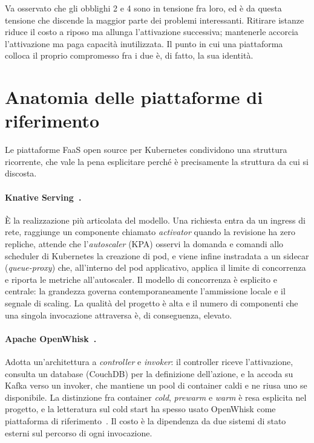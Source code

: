 Va osservato che gli obblighi 2 e 4 sono in tensione fra loro, ed \`e da questa
tensione che discende la maggior parte dei problemi interessanti. Ritirare
istanze riduce il costo a riposo ma allunga l'attivazione successiva; mantenerle
accorcia l'attivazione ma paga capacit\`a inutilizzata. Il punto in cui una
piattaforma colloca il proprio compromesso fra i due \`e, di fatto, la sua
identit\`a.

\section{Anatomia delle piattaforme di riferimento}

Le piattaforme FaaS open source per Kubernetes condividono una struttura
ricorrente, che vale la pena esplicitare perch\'e \`e precisamente la struttura
da cui \nf{} si discosta.

\paragraph{Knative Serving~\cite{knative}.} \`E la realizzazione pi\`u
articolata del modello. Una richiesta entra da un ingress di rete, raggiunge un
componente chiamato \emph{activator} quando la revisione ha zero repliche,
attende che l'\emph{autoscaler} (KPA) osservi la domanda e comandi allo
scheduler di Kubernetes la creazione di pod, e viene infine instradata a un
sidecar (\emph{queue-proxy}) che, all'interno del pod applicativo, applica il
limite di concorrenza e riporta le metriche all'autoscaler. Il modello di
concorrenza \`e esplicito e centrale: la grandezza 
governa contemporaneamente l'ammissione locale e il segnale di scaling. La
qualit\`a del progetto \`e alta e il numero di componenti che una singola
invocazione attraversa \`e, di conseguenza, elevato.

\paragraph{Apache OpenWhisk~\cite{openwhisk}.} Adotta un'architettura a
\emph{controller} e \emph{invoker}: il controller riceve l'attivazione, consulta
un database (CouchDB) per la definizione dell'azione, e la accoda su Kafka verso
un invoker, che mantiene un pool di container caldi e ne riusa uno se
disponibile. La distinzione fra container \emph{cold}, \emph{prewarm} e
\emph{warm} \`e resa esplicita nel progetto, e la letteratura sul cold start ha
spesso usato OpenWhisk come piattaforma di riferimento~\cite{wang2018peeking}.
Il costo \`e la dipendenza da due sistemi di stato esterni sul percorso di ogni
invocazione.

